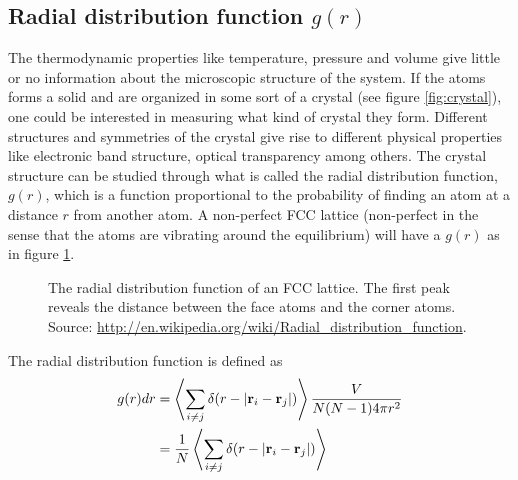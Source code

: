 \subsection{Radial distribution function $g(r)$}
The thermodynamic properties like temperature, pressure and volume give little or no information about the microscopic structure of the system. If the atoms forms a solid and are organized in some sort of a crystal (see figure \ref{fig:crystal}), one could be interested in measuring what kind of crystal they form. Different structures and symmetries of the crystal give rise to different physical properties like electronic band structure, optical transparency among others\cite{kittel1996introduction}. The crystal structure can be studied through what is called the radial distribution function, $g(r)$, which is a function proportional to the probability of finding an atom at a distance $r$ from another atom. A non-perfect FCC lattice (non-perfect in the sense that the atoms are vibrating around the equilibrium) will have a $g(r)$ as in figure \ref{fig:fcc_lattice_g_of_r}.\\
\begin{figure}[h]
\label{fig:fcc_lattice_g_of_r}
\centering
\caption{The radial distribution function of an FCC lattice. The first peak reveals the distance between the face atoms and the corner atoms. Source: \url{http://en.wikipedia.org/wiki/Radial_distribution_function}.}
\end{figure}
The radial distribution function is defined as
\begin{align}
    \label{eq:g_of_r}
    g(r)dr &= \left\langle \sum_{i\neq j}\delta(r - |\vec r_i - \vec r_j|)\right\rangle{V\over N(N-1)4\pi r^2}\\
    &= {1 \over N} \left\langle \sum_{i\neq j}\delta(r - |\vec r_i - \vec r_j|)\right\rangle
\end{align}
